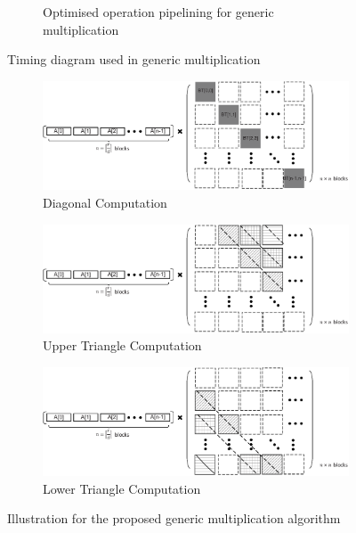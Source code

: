 \documentclass[preprint]{iacrtrans}
\begin{document}
\begin{figure}[!tb]
\begin{subfigure}[t]{0.47\textwidth}
\caption{Optimised operation pipelining for generic multiplication }
\label{fig:pipeline_gmul2}
\end{subfigure}
\caption{Timing diagram used in generic multiplication}
\end{figure}


\begin{figure}[!tb]
\centering
\begin{subfigure}[t]{0.45\textwidth}\centering
\includegraphics[width=\textwidth]{./fig/generic_mul_illustrate.eps}
\caption{Diagonal Computation}
\label{fig:gmul_ill1}
\end{subfigure}
\hspace{1em}
\begin{subfigure}[t]{0.45\textwidth}\centering
\includegraphics[width=\textwidth]{./fig/generic_mul_illustrate2.eps}
\caption{Upper Triangle Computation}
\label{fig:gmul_ill2}
\end{subfigure}
\hspace{1em}
\begin{subfigure}[t]{0.45\textwidth}\centering
\includegraphics[width=\textwidth]{./fig/generic_mul_illustrate3.eps}
\caption{Lower Triangle Computation}
\label{fig:gmul_ill3}
\end{subfigure}
\caption{Illustration for the proposed generic multiplication algorithm}
\end{figure}
\end{document}
